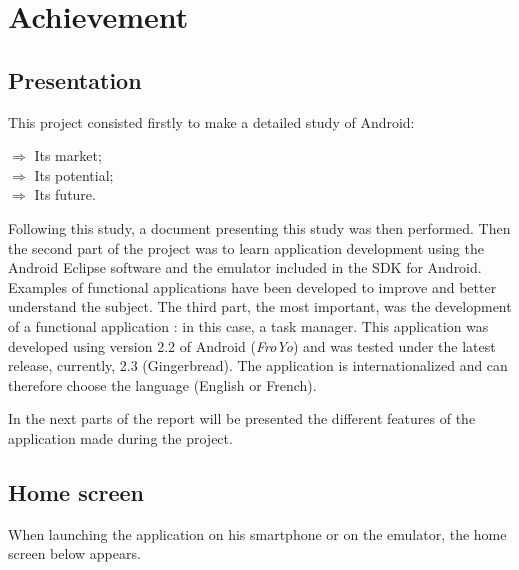 \chapter{Achievement}

\section{Presentation}

This project consisted firstly to make a detailed study of Android:
\begin{description}
    \item[$\Rightarrow$ Its market;]
    \item[$\Rightarrow$ Its potential;]
    \item[$\Rightarrow$ Its future.]
\end{description}

\noindent Following this study, a document presenting this study was then performed.
Then the second part of the project was to learn application development using the Android Eclipse software and the emulator included in the SDK for Android.
Examples of functional applications have been developed to improve and better understand the subject.
The third part, the most important, was the development of a functional application : in this case, a task manager. This application was developed using version 2.2 of Android (\textit{FroYo}) and was tested under the latest release, currently, 2.3 (Gingerbread). The application is internationalized and can therefore choose the language (English or French).

\noindent In the next parts of the report will be presented the different features of the application made during the project.

\section{Home screen}

When launching the application on his smartphone or on the emulator, the home screen below appears.



